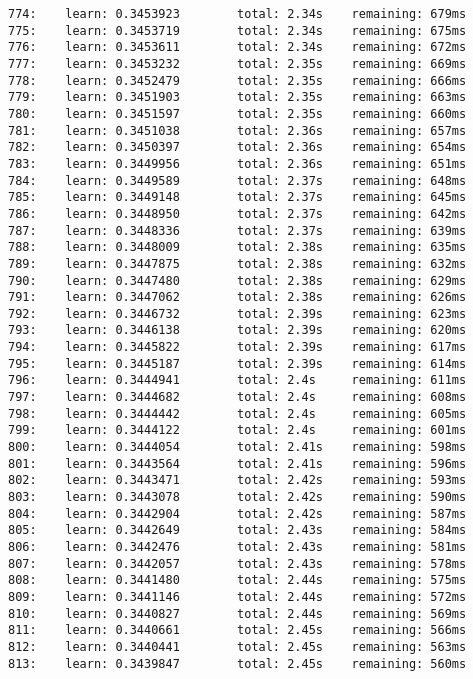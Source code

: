 \documentclass[11pt]{article}
\begin{document}
\begin{Verbatim}[commandchars=\\\{\}]
774:    learn: 0.3453923        total: 2.34s    remaining: 679ms
775:    learn: 0.3453719        total: 2.34s    remaining: 675ms
776:    learn: 0.3453611        total: 2.34s    remaining: 672ms
777:    learn: 0.3453232        total: 2.35s    remaining: 669ms
778:    learn: 0.3452479        total: 2.35s    remaining: 666ms
779:    learn: 0.3451903        total: 2.35s    remaining: 663ms
780:    learn: 0.3451597        total: 2.35s    remaining: 660ms
781:    learn: 0.3451038        total: 2.36s    remaining: 657ms
782:    learn: 0.3450397        total: 2.36s    remaining: 654ms
783:    learn: 0.3449956        total: 2.36s    remaining: 651ms
784:    learn: 0.3449589        total: 2.37s    remaining: 648ms
785:    learn: 0.3449148        total: 2.37s    remaining: 645ms
786:    learn: 0.3448950        total: 2.37s    remaining: 642ms
787:    learn: 0.3448336        total: 2.37s    remaining: 639ms
788:    learn: 0.3448009        total: 2.38s    remaining: 635ms
789:    learn: 0.3447875        total: 2.38s    remaining: 632ms
790:    learn: 0.3447480        total: 2.38s    remaining: 629ms
791:    learn: 0.3447062        total: 2.38s    remaining: 626ms
792:    learn: 0.3446732        total: 2.39s    remaining: 623ms
793:    learn: 0.3446138        total: 2.39s    remaining: 620ms
794:    learn: 0.3445822        total: 2.39s    remaining: 617ms
795:    learn: 0.3445187        total: 2.39s    remaining: 614ms
796:    learn: 0.3444941        total: 2.4s     remaining: 611ms
797:    learn: 0.3444682        total: 2.4s     remaining: 608ms
798:    learn: 0.3444442        total: 2.4s     remaining: 605ms
799:    learn: 0.3444122        total: 2.4s     remaining: 601ms
800:    learn: 0.3444054        total: 2.41s    remaining: 598ms
801:    learn: 0.3443564        total: 2.41s    remaining: 596ms
802:    learn: 0.3443471        total: 2.42s    remaining: 593ms
803:    learn: 0.3443078        total: 2.42s    remaining: 590ms
804:    learn: 0.3442904        total: 2.42s    remaining: 587ms
805:    learn: 0.3442649        total: 2.43s    remaining: 584ms
806:    learn: 0.3442476        total: 2.43s    remaining: 581ms
807:    learn: 0.3442057        total: 2.43s    remaining: 578ms
808:    learn: 0.3441480        total: 2.44s    remaining: 575ms
809:    learn: 0.3441146        total: 2.44s    remaining: 572ms
810:    learn: 0.3440827        total: 2.44s    remaining: 569ms
811:    learn: 0.3440661        total: 2.45s    remaining: 566ms
812:    learn: 0.3440441        total: 2.45s    remaining: 563ms
813:    learn: 0.3439847        total: 2.45s    remaining: 560ms

\end{Verbatim}
\end{document}
